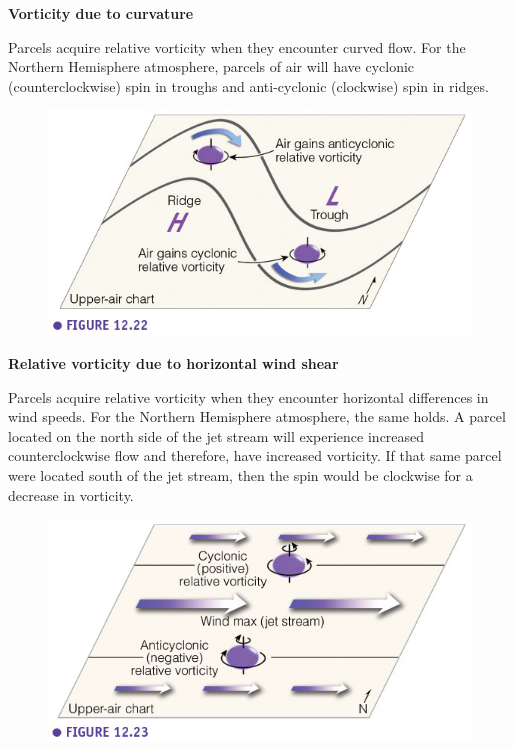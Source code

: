 \documentclass[12pt,oneside]{book}
\begin{document}
\textbf{Vorticity due to curvature}

Parcels acquire relative vorticity when they encounter curved flow. For
the Northern Hemisphere atmosphere, parcels of air will have cyclonic
(counterclockwise) spin in troughs and anti-cyclonic (clockwise) spin in
ridges.

\begin{figure}

{\centering \includegraphics[width=0.8\linewidth]{figures/Figure634b} 

}

\caption{ }\label{fig:Fig634b}
\end{figure}

\textbf{Relative vorticity due to horizontal wind shear}

Parcels acquire relative vorticity when they encounter horizontal
differences in wind speeds. For the Northern Hemisphere atmosphere, the
same holds. A parcel located on the north side of the jet stream will
experience increased counterclockwise flow and therefore, have increased
vorticity. If that same parcel were located south of the jet stream,
then the spin would be clockwise for a decrease in vorticity.

\begin{figure}

{\centering \includegraphics[width=0.8\linewidth]{figures/Figure634c} 

}

\caption{ }\label{fig:Fig634c}
\end{figure}
\end{document}
